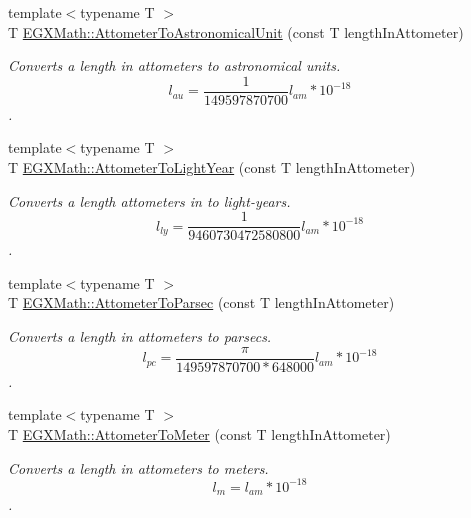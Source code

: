 \begin{DoxyCompactItemize}
\item 
{\footnotesize template$<$typename T $>$ }\\T \mbox{\hyperlink{group___e_g_x_math-_conversions-_length_conversions-_s_i-_attometer-_astronomical_ga194198d78186434768016c930eae1933}{E\+G\+X\+Math\+::\+Attometer\+To\+Astronomical\+Unit}} (const T length\+In\+Attometer)
\begin{DoxyCompactList}\small\item\em Converts a length in attometers to astronomical units. \[ l_{au}= \frac{1}{149597870700} l_{am} * 10^{-18}\]. \end{DoxyCompactList}\item 
{\footnotesize template$<$typename T $>$ }\\T \mbox{\hyperlink{group___e_g_x_math-_conversions-_length_conversions-_s_i-_attometer-_astronomical_gaca916475a6757e4eb793a7f09bbf46b1}{E\+G\+X\+Math\+::\+Attometer\+To\+Light\+Year}} (const T length\+In\+Attometer)
\begin{DoxyCompactList}\small\item\em Converts a length attometers in to light-\/years. \[ l_{ly}= \frac{1}{9460730472580800} l_{am} * 10^{-18} \]. \end{DoxyCompactList}\item 
{\footnotesize template$<$typename T $>$ }\\T \mbox{\hyperlink{group___e_g_x_math-_conversions-_length_conversions-_s_i-_attometer-_astronomical_ga2f4a0e26e97c60a8f37a1f813d158f48}{E\+G\+X\+Math\+::\+Attometer\+To\+Parsec}} (const T length\+In\+Attometer)
\begin{DoxyCompactList}\small\item\em Converts a length in attometers to parsecs. \[ l_{pc}=\frac{\pi}{149597870700 * 648000} l_{am} * 10^{-18} \]. \end{DoxyCompactList}\item 
{\footnotesize template$<$typename T $>$ }\\T \mbox{\hyperlink{group___e_g_x_math-_conversions-_length_conversions-_s_i-_attometer-_s_i_gaa987cce911ce54c3022444537c705b97}{E\+G\+X\+Math\+::\+Attometer\+To\+Meter}} (const T length\+In\+Attometer)
\begin{DoxyCompactList}\small\item\em Converts a length in attometers to meters. \[ l_{m}=l_{am}* 10^{-18} \]. \end{DoxyCompactList}\item 

\end{DoxyCompactItemize}
